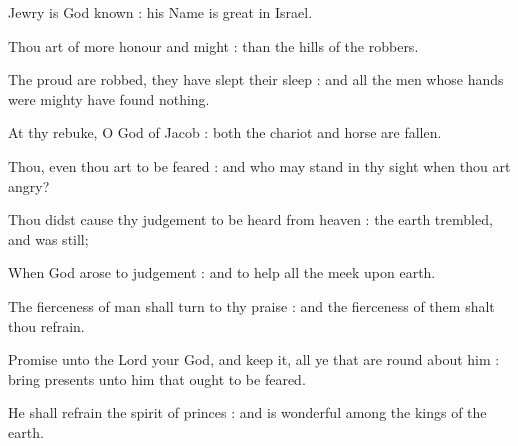 
 Jewry is God known : his Name is great in Israel.\par
{}
Thou art of more honour and might : than the hills of the robbers.\par
{}The proud are robbed, they have slept their sleep : and all the men whose hands were mighty have found nothing.\par
{}At thy rebuke, O God of Jacob : both the chariot and horse are fallen.\par
{}Thou, even thou art to be feared : and who may stand in thy sight when thou art angry?\par
{}Thou didst cause thy judgement to be heard from heaven : the earth trembled, and was still;\par
{}When God arose to judgement : and to help all the meek upon earth.\par
{}The fierceness of man shall turn to thy praise : and the fierceness of them shalt thou refrain.\par
{}Promise unto the Lord your God, and keep it, all ye that are round about him : bring presents unto him that ought to be feared.\par
{}He shall refrain the spirit of princes : and is wonderful among the kings of the earth.\par



